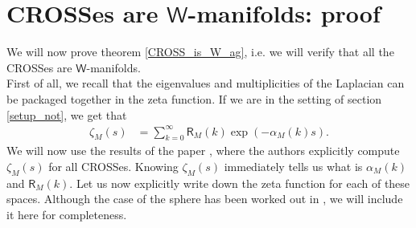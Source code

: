 \documentclass[11pt,lettersize,reqno,fullpage]{amsart}
\providecommand \hf{\hspace*{0.5cm}}
\begin{document}
\section{CROSSes are $\mathsf{W}$-manifolds: proof} 
\label{CROSS_is_W}
We will now prove theorem \ref{CROSS_is_W_ag}, i.e. we will 
verify that all the CROSSes are $\mathsf{W}$-manifolds.\\ 
\hf \hf First of all, we recall that the eigenvalues and multiplicities of the 
Laplacian can be packaged together in the zeta function. 
If we are in the setting of section \ref{setup_not}, we get that 
\begin{align}
\zeta_{M}(s) & = \sum_{k=0}^{\infty} \mathsf{R}_M(k) \exp(-\alpha_M(k)s). \label{zeta_general}
\end{align}  
We will now use the results of the paper \cite{Cahn}, where the authors explicitly compute 
$\zeta_{M}(s)$ for all CROSSes. Knowing $\zeta_{M}(s)$ immediately tells us what is 
$\alpha_M(k)$ and $\mathsf{R}_M(k)$. Let us now explicitly write down the zeta function for 
each of these spaces. Although the case of the sphere has been worked out in \cite{Weyl_Wyman_Iosevich}, we will  
include it here for completeness.  
\end{document}
